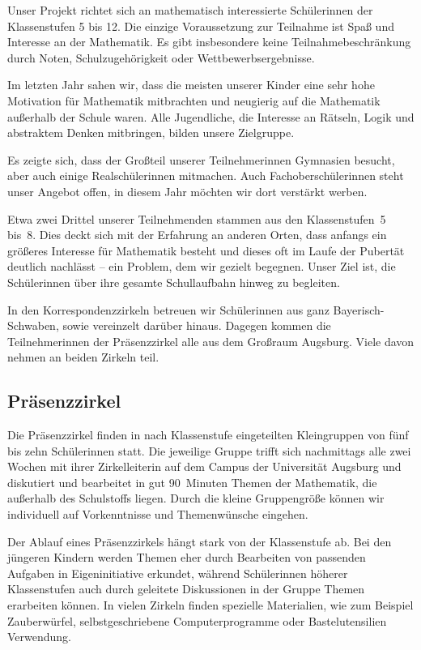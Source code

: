 \documentclass[12pt]{zettel}
\begin{document}
Unser Projekt richtet sich an mathematisch interessierte Schülerinnen
der Klassenstufen 5 bis 12. Die einzige Voraussetzung zur
Teilnahme ist Spaß und Interesse an der Mathematik. Es gibt insbesondere
keine Teilnahmebeschränkung durch Noten, Schulzugehörigkeit oder
Wettbewerbsergebnisse.

Im letzten Jahr sahen wir, dass die meisten unserer Kinder eine
sehr hohe Motivation für Mathematik mitbrachten und neugierig auf die
Mathematik außerhalb der Schule waren. Alle Jugendliche, die Interesse an
Rätseln, Logik und abstraktem Denken mitbringen, bilden unsere
Zielgruppe.

Es zeigte sich, dass der Großteil unserer Teilnehmerinnen Gymnasien besucht, aber auch einige Realschülerinnen mitmachen.
Auch Fachoberschülerinnen steht unser Angebot offen, in diesem Jahr möchten wir dort verstärkt werben.

Etwa zwei Drittel unserer Teilnehmenden
stammen aus den Klassenstufen~5 bis~8.
Dies deckt sich mit der
Erfahrung an anderen Orten, dass anfangs ein größeres Interesse für
Mathematik besteht und dieses oft im Laufe der Pubertät
deutlich nachlässt -- ein Problem, dem wir gezielt begegnen. Unser Ziel ist, die Schülerinnen über ihre gesamte Schullaufbahn hinweg zu begleiten.

In den Korrespondenzzirkeln betreuen wir Schülerinnen aus ganz Bayerisch-Schwaben, sowie vereinzelt darüber hinaus. Dagegen kommen die Teilnehmerinnen
der Prä\-senz\-zir\-kel alle aus dem Großraum Augsburg. Viele davon
nehmen an beiden Zirkeln teil.


\subsection{Präsenzzirkel}

Die Präsenzzirkel finden in nach Klassenstufe eingeteilten
Kleingruppen von fünf bis zehn Schülerinnen statt.
Die jeweilige Gruppe trifft sich nachmittags alle zwei Wochen mit ihrer Zirkelleiterin auf dem Campus der Universität Augsburg und diskutiert und
bearbeitet in gut 90~Minuten Themen der Mathematik, die außerhalb des
Schulstoffs liegen. Durch die kleine Gruppengröße können wir individuell auf
Vorkenntnisse und Themenwünsche eingehen.

Der Ablauf eines Präsenzzirkels hängt stark von der Klassenstufe ab. Bei den
jüngeren Kindern werden Themen eher durch Bearbeiten von passenden
Aufgaben in Eigeninitiative erkundet, während Schülerinnen höherer
Klassenstufen auch durch geleitete Diskussionen in der Gruppe
Themen erarbeiten können. In vielen Zirkeln finden spezielle Materialien,
wie zum Beispiel Zauberwürfel, selbstgeschriebene Computerprogramme oder
Bastelutensilien Verwendung.
\end{document}
